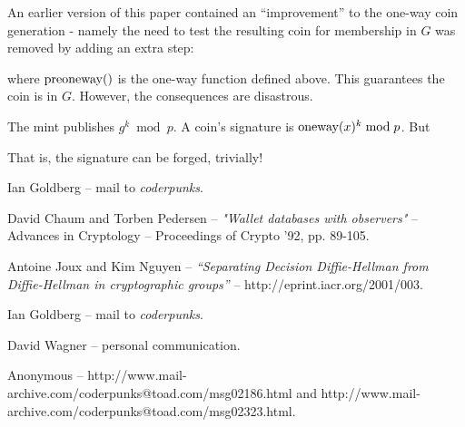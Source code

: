 \documentclass[a4paper,titlepage]{article}
\begin{document}
An earlier version of this paper contained an ``improvement'' to the
one-way coin generation - namely the need to test the resulting coin
for membership in $G$ was removed by adding an extra step:


where $\preoneway$ is the one-way function defined above. This guarantees
the coin is in $G$. However, the consequences are disastrous\cite{Wagner}.

The mint publishes $g^k \bmod p$. A coin's signature is $\textrm{oneway}(x)^k \bmod p$. But


That is, the signature can be forged, trivially!

\begin{thebibliography}{99}

	 Ian Goldberg -- mail to {\sl coderpunks}.

	 David Chaum and Torben Pedersen -- {\sl
	"Wallet databases with observers"} -- Advances in Cryptology
	-- Proceedings of Crypto '92, pp. 89-105.

	 Antoine Joux and Kim Nguyen -- {\sl
	``Separating Decision Diffie-Hellman from Diffie-Hellman in
	cryptographic groups''} -- http://eprint.iacr.org/2001/003.

	 Ian Goldberg -- mail to {\sl coderpunks}.

	 David Wagner -- personal communication.

	 Anonymous --
	http://www.mail-archive.com/coderpunks@toad.com/msg02186.html
	and
	http://www.mail-archive.com/coderpunks@toad.com/msg02323.html.

\end{thebibliography}
\end{document}
